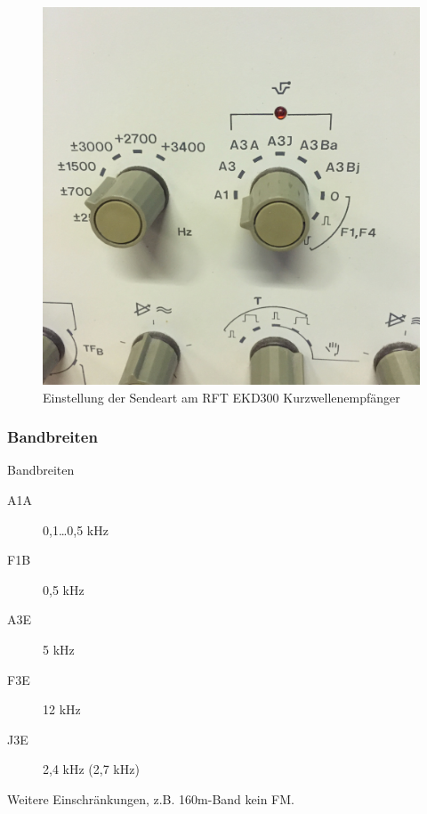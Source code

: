 \begin{frame}
  \begin{figure}
    \begin{center}
      \includegraphics[width=\textwidth,height=.75\textheight,keepaspectratio]{bv09/RFT_EKD300.jpg}
    \end{center}
    \caption{Einstellung der Sendeart am RFT EKD300 Kurzwellenempfänger}
  \end{figure}
\end{frame}

\begin{frame}
  \frametitle{Bandbreiten}

  \begin{block}{Bandbreiten}
    \begin{description}
      \item[A1A] 0,1\ldots0,5 kHz
      \item[F1B] 0,5 kHz
      \item[A3E] 5 kHz
      \item[F3E] 12 kHz
      \item[J3E] 2,4 kHz (2,7 kHz)
    \end{description}
  \end{block}

  Weitere Einschränkungen, z.B. 160m-Band kein FM.

\end{frame}


